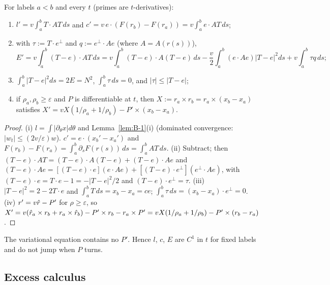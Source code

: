 \begin{lemma}\label{lem:B-2}
For labels $a<b$ and every $t$ (primes are $t$-derivatives):
\begin{enumerate}
\item[(i)] $l'=v\int_a^bT\cdot AT\,ds$ and $c'=v\,e\cdot(F(r_b)-F(r_a))=v\int_a^be\cdot AT\,ds$;
\item[(ii)] with $\tau:=T\cdot e^\perp$ and $q:=e^\perp\cdot Ae$ (where $A=A(r(s))$),
\[
E'=v\int_a^b(T-e)\cdot AT\,ds=v\int_a^b(T-e)\cdot A(T-e)\,ds-\frac v2\int_a^b(e\cdot Ae)|T-e|^2ds+v\int_a^b\tau q\,ds;
\]
\item[(iii)] $\int_a^b|T-e|^2ds=2E=N^2$, $\int_a^b\tau\,ds=0$, and $|\tau|\le|T-e|$;
\item[(iv)] if $\rho_a,\rho_b\ge\varepsilon$ and $P$ is differentiable at $t$, then $X:=r_a\times r_b=r_a\times(x_b-x_a)$ satisfies
$X'=vX(1/\rho_a+1/\rho_b)-P'\times(x_b-x_a)$.
\end{enumerate}
\end{lemma}
\begin{proof}
(i) $l=\int|\partial_\theta x|d\theta$ and Lemma~\ref{lem:B-1}(i) (dominated convergence: $|w_t|\le(2v/\varepsilon)w$).
$c'=e\cdot(x_b'-x_a')$ and $F(r_b)-F(r_a)=\int_a^b\partial_sF(r(s))\,ds=\int_a^bAT\,ds$. (ii) Subtract; then
$(T-e)\cdot AT=(T-e)\cdot A(T-e)+(T-e)\cdot Ae$ and
$(T-e)\cdot Ae=[(T-e)\cdot e](e\cdot Ae)+[(T-e)\cdot e^\perp](e^\perp\cdot Ae)$, with $(T-e)\cdot e=T\cdot e-1=-|T-e|^2/2$ and
$(T-e)\cdot e^\perp=\tau$. (iii) $|T-e|^2=2-2T\cdot e$ and $\int_a^bT\,ds=x_b-x_a=ce$; $\int_a^b\tau\,ds=(x_b-x_a)\cdot e^\perp=0$.
(iv) $r'=v\hat r-P'$ for $\rho\ge\varepsilon$, so
$X'=v(\hat r_a\times r_b+r_a\times\hat r_b)-P'\times r_b-r_a\times P'=vX(1/\rho_a+1/\rho_b)-P'\times(r_b-r_a)$.
\end{proof}
The variational equation contains no $P'$. Hence $l$, $c$, $E$ are $C^1$ in $t$ for fixed labels and do not jump when $P$ turns.

\subsection{Excess calculus}

